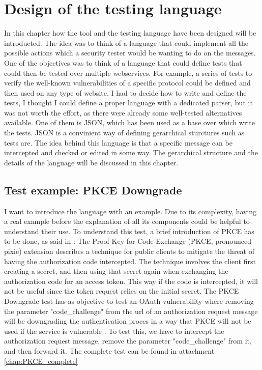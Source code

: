 \chapter{Design of the testing language}
In this chapter how the tool and the testing language have been designed will be introducted. The idea was to think of a language that could implement all the possible actions which a security tester would be wanting to do on the messages. One of the objectives was to think of a language that could define tests that could then be tested over multiple webservices. For example, a series of tests to verify the well-known vulnerabilities of a specific protocol could be defined and then used on any type of website.
I had to decide how to write and define the tests, I thought I could define a proper language with a dedicated parser, but it was not worth the effort, as there were already some well-tested alternatives available. One of them is JSON, which has been used as a base over which write the tests. JSON is a convinient way of defining gerarchical sturctures such as tests are.
The idea behind this language is that a specific message can be intercepted and checked or edited in some way.
The gerarchical structure and the details of the language will be discussed in this chapter.

\section{Test example: PKCE Downgrade}
I want to introduce the language with an example. Due to its complexity, having a real example before the explanation of all its components could be helpful to understand their use.
To understand this test, a brief introduction of PKCE has to be done, as said in \cite{pkce_explanation}: The Proof Key for Code Exchange (PKCE, pronounced pixie) extension describes a technique for public clients to mitigate the threat of having the authorization code intercepted. The technique involves the client first creating a secret, and then using that secret again when exchanging the authorization code for an access token. This way if the code is intercepted, it will not be useful since the token request relies on the initial secret. 
The PKCE Downgrade test has as objective to test an \Gls{OAuth} vulnerability where removing the parameter "code\_challenge" from the url of an authorization request message will be downgrading the authentication proces in a way that PKCE will not be used if the service is vulnerable \cite{pkce_downgrade}. To test this, we have to intercept the authorization request message, remove the parameter "code\_challenge" from it, and then forward it.
The complete test can be found in attachment \ref{chap:PKCE_complete}


